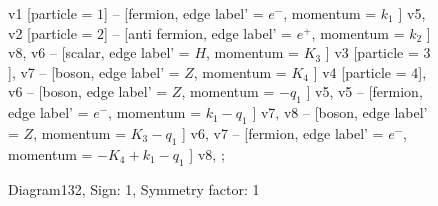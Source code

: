 \documentclass{revtex4}
\begin{document}
\begin{figure}[!htb]
\begin{center}
{    %
v1 [particle = \(1\)] -- [fermion, edge label' = \(e^{-}\), momentum = \(k_{1}\) ] v5, 
v2 [particle = \(2\)] -- [anti fermion, edge label' = \(e^{+}\), momentum = \(k_{2}\) ] v8, 
v6 -- [scalar, edge label' = \(H\), momentum = \(K_{3}\) ] v3 [particle = \(3\)], 
v7 -- [boson, edge label' = \(Z\), momentum = \(K_{4}\) ] v4 [particle = \(4\)], 
v6 -- [boson, edge label' = \(Z\), momentum = \(-q_{1}\) ] v5, 
v5 -- [fermion, edge label' = \(e^{-}\), momentum = \(k_{1} - q_{1}\) ] v7, 
v8 -- [boson, edge label' = \(Z\), momentum = \(K_{3} - q_{1}\) ] v6, 
v7 -- [fermion, edge label' = \(e^{-}\), momentum = \(-K_{4} + k_{1} - q_{1}\) ] v8, 
};
\end{center}
\caption{Diagram132, Sign: 1, Symmetry factor: 1}
\end{figure}
\newpage
\end{document}
